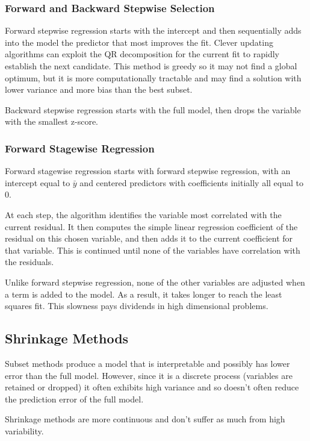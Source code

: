 \documentclass[11pt]{article}
\begin{document}
\subsubsection{Forward and Backward Stepwise Selection}
\label{sec:org5db5659}

Forward stepwise regression starts with the intercept and then sequentially adds into the model the predictor that most improves the fit. Clever updating algorithms can exploit the QR decomposition for the current fit to rapidly establish the next candidate. This method is greedy so it may not find a global optimum, but it is more computationally tractable and may find a solution with lower variance and more bias than the best subset. 

Backward stepwise regression starts with the full model, then drops the variable with the smallest z-score.

\subsubsection{Forward Stagewise Regression}
\label{sec:org4cd1aca}

Forward stagewise regression starts with forward stepwise regression, with an intercept equal to \(\bar{y}\) and centered predictors with coefficients initially all equal to 0. 

At each step, the algorithm identifies the variable most correlated with the current residual. It then computes the simple linear regression coefficient of the residual on this chosen variable, and then adds it to the current coefficient for that variable. This is continued until none of the variables have correlation with the residuals. 

Unlike forward stepwise regression, none of the other variables are adjusted when a term is added to the model. As a result, it takes longer to reach the least squares fit. This slowness pays dividends in high dimensional problems.
\subsection{Shrinkage Methods}
\label{sec:org622e7e3}

Subset methods produce a model that is interpretable and possibly has lower error than the full model. However, since it is a discrete process (variables are retained or dropped) it often exhibits high variance and so doesn't often reduce the prediction error of the full model. 

Shrinkage methods are more continuous and don't suffer as much from high variability.
\end{document}
